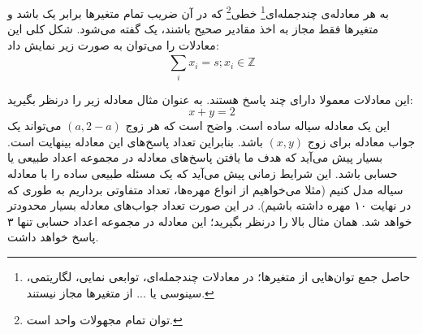 
\begin{DEFINITION}
    \p
    به هر معادله‌ی چندجمله‌ای\footnote{حاصل جمع توان‌هایی از متغیر‌ها؛ در معادلات چندجمله‌ای،
    توابعی نمایی، لگاریتمی، سینوسی یا ... از متغیر‌ها مجاز نیستند.}
    خطی\footnote{توان تمام مجهولات واحد است.}
    که در آن ضریب تمام متغیر‌ها برابر یک باشد
    و متغیر‌ها فقط مجاز به اخذ مقادیر صحیح باشند،
    یک
    گفته می‌شود.
    شکل کلی این معادلات را می‌توان به صورت زیر نمایش داد:
    $$\sum\limits_{i}^{} {x_i} = s ; x_i \in \mathbb{Z}$$
\end{DEFINITION}

\p
این معادلات معمولا دارای چند پاسخ هستند.
به عنوان مثال معادله زیر را درنظر بگیرید:
$$x + y = 2$$
این یک معادله سیاله ساده است.
واضح است که هر زوج
$(a, 2-a)$
می‌تواند یک جواب معادله برای زوج
$(x,y)$
باشد. بنابراین تعداد پاسخ‌های این معادله بینهایت است.
بسیار پیش می‌آید که هدف ما یافتن پاسخ‌های معادله در مجموعه اعداد طبیعی یا حسابی باشد.
این شرایط زمانی پیش می‌آید که یک مسئله طبیعی ساده را با معادله سیاله مدل کنیم
(مثلا می‌خواهیم از انواع مهره‌ها، تعداد متفاوتی برداریم به طوری که در نهایت ۱۰ مهره داشته باشیم).
در این صورت تعداد جواب‌های معادله بسیار محدود‌تر خواهد شد.
همان مثال بالا را درنظر بگیرید؛ این معادله در مجموعه اعداد حسابی تنها ۳ پاسخ خواهد داشت.





